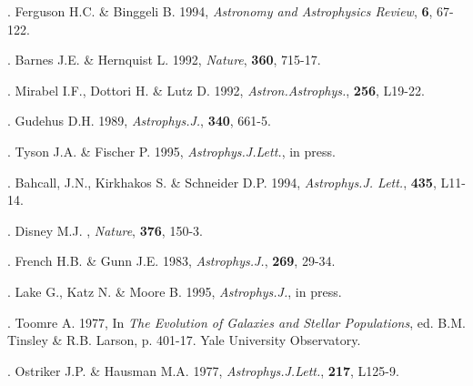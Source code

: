 . Ferguson H.C. \& Binggeli B. 1994, {\it Astronomy and Astrophysics
Review},
{\bf 6}, 67-122.

. Barnes J.E. \& Hernquist L. 1992, {\it Nature}, {\bf 360}, 715-17.

. Mirabel I.F., Dottori H. \& Lutz D. 1992, {\it Astron.Astrophys.}, {\bf
256}, L19-22.

. Gudehus D.H. 1989, {\it Astrophys.J.}, {\bf 340}, 661-5.

. Tyson J.A. \& Fischer P. 1995, {\it Astrophys.J.Lett.}, in press.

. Bahcall, J.N., Kirkhakos S. \& Schneider D.P. 1994, {\it Astrophys.J.
Lett.},
{\bf 435}, L11-14.

. Disney M.J. , {\it Nature}, {\bf 376}, 150-3.

. French H.B. \& Gunn J.E. 1983, {\it Astrophys.J.}, {\bf 269}, 29-34.

. Lake G., Katz N. \& Moore B. 1995, {\it Astrophys.J.}, in press.

. Toomre A. 1977, In {\it The Evolution of Galaxies and Stellar
Populations},
ed. B.M. Tinsley \& R.B. Larson, p. 401-17. Yale University Observatory.

. Ostriker J.P. \& Hausman M.A. 1977, {\it Astrophys.J.Lett.}, {\bf 217},
L125-9.







